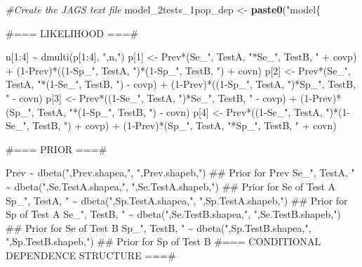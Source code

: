 \documentclass[
]{book}
\newenvironment{Shaded}{\begin{snugshade}}{\end{snugshade}}
\newcommand{\CommentTok}[1]{\textcolor[rgb]{0.56,0.35,0.01}{\textit{#1}}}
\newcommand{\FunctionTok}[1]{\textcolor[rgb]{0.13,0.29,0.53}{\textbf{#1}}}
\newcommand{\NormalTok}[1]{#1}
\newcommand{\OtherTok}[1]{\textcolor[rgb]{0.56,0.35,0.01}{#1}}
\newcommand{\StringTok}[1]{\textcolor[rgb]{0.31,0.60,0.02}{#1}}
\begin{document}
\begin{Shaded}
\begin{Highlighting}[]
\CommentTok{\#Create the JAGS text file}
\NormalTok{model\_2tests\_1pop\_dep }\OtherTok{\textless{}{-}} \FunctionTok{paste0}\NormalTok{(}\StringTok{"model\{}

\StringTok{\#=== LIKELIHOOD ===\#}

\StringTok{  n[1:4] \textasciitilde{} dmulti(p[1:4], "}\NormalTok{,n,}\StringTok{")}
\StringTok{  p[1] \textless{}{-} Prev*(Se\_"}\NormalTok{, TestA, }\StringTok{"*Se\_"}\NormalTok{, TestB, }\StringTok{" + covp) + (1{-}Prev)*((1{-}Sp\_"}\NormalTok{, TestA, }\StringTok{")*(1{-}Sp\_"}\NormalTok{, TestB, }\StringTok{") + covn)}
\StringTok{  p[2] \textless{}{-} Prev*(Se\_"}\NormalTok{, TestA, }\StringTok{"*(1{-}Se\_"}\NormalTok{, TestB, }\StringTok{") {-} covp) + (1{-}Prev)*((1{-}Sp\_"}\NormalTok{, TestA, }\StringTok{")*Sp\_"}\NormalTok{, TestB, }\StringTok{" {-} covn)}
\StringTok{  p[3] \textless{}{-} Prev*((1{-}Se\_"}\NormalTok{, TestA, }\StringTok{")*Se\_"}\NormalTok{, TestB, }\StringTok{" {-} covp) + (1{-}Prev)*(Sp\_"}\NormalTok{, TestA, }\StringTok{"*(1{-}Sp\_"}\NormalTok{, TestB, }\StringTok{") {-} covn)}
\StringTok{  p[4] \textless{}{-} Prev*((1{-}Se\_"}\NormalTok{, TestA, }\StringTok{")*(1{-}Se\_"}\NormalTok{, TestB, }\StringTok{") + covp) + (1{-}Prev)*(Sp\_"}\NormalTok{, TestA, }\StringTok{"*Sp\_"}\NormalTok{, TestB, }\StringTok{" + covn)}

\StringTok{\#=== PRIOR  ===\#}

\StringTok{  Prev \textasciitilde{} dbeta("}\NormalTok{,Prev.shapea,}\StringTok{", "}\NormalTok{,Prev.shapeb,}\StringTok{")    \#\# Prior for Prev}
\StringTok{  Se\_"}\NormalTok{, TestA, }\StringTok{" \textasciitilde{} dbeta("}\NormalTok{,Se.TestA.shapea,}\StringTok{", "}\NormalTok{,Se.TestA.shapeb,}\StringTok{")  \#\# Prior for Se of Test A}
\StringTok{  Sp\_"}\NormalTok{, TestA, }\StringTok{" \textasciitilde{} dbeta("}\NormalTok{,Sp.TestA.shapea,}\StringTok{", "}\NormalTok{,Sp.TestA.shapeb,}\StringTok{")  \#\# Prior for Sp of Test A}
\StringTok{  Se\_"}\NormalTok{, TestB, }\StringTok{" \textasciitilde{} dbeta("}\NormalTok{,Se.TestB.shapea,}\StringTok{", "}\NormalTok{,Se.TestB.shapeb,}\StringTok{")  \#\# Prior for Se of Test B}
\StringTok{  Sp\_"}\NormalTok{, TestB, }\StringTok{" \textasciitilde{} dbeta("}\NormalTok{,Sp.TestB.shapea,}\StringTok{", "}\NormalTok{,Sp.TestB.shapeb,}\StringTok{")  \#\# Prior for Sp of Test B}
\StringTok{  }
\StringTok{\#=== CONDITIONAL DEPENDENCE STRUCTURE ===\#}


\end{Highlighting}
\end{Shaded}
\end{document}
